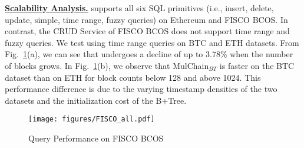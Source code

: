 \noindent
\textbf{\underline{Scalability Analysis.}}
\Chain supports all six SQL primitives (i.e., insert, delete, update, simple, time range, fuzzy queries) on Ethereum and FISCO BCOS. 
In contrast, the CRUD Service of FISCO BCOS does not support time range and fuzzy queries. 
We test \Chain using time range queries on BTC and ETH datasets. 
From Fig.~\ref{fig:FISCO BCOS}(a), we can see that \Chain undergoes a decline of up to 3.78\% when the number of blocks grows.
In Fig.~\ref{fig:FISCO BCOS}(b), we observe that MulChain$_{BT}$ is faster on the BTC dataset than on ETH for block counts below 128 and above 1024. 
This performance difference is due to the varying timestamp densities of the two datasets and the initialization cost of the B\(+\)Tree.


\begin{figure}[htbp]
    \centering
    \texttt{[image: figures/FISCO\_all.pdf]}
    \caption{Query Performance on FISCO BCOS}
    \label{fig:FISCO BCOS}
\end{figure}


